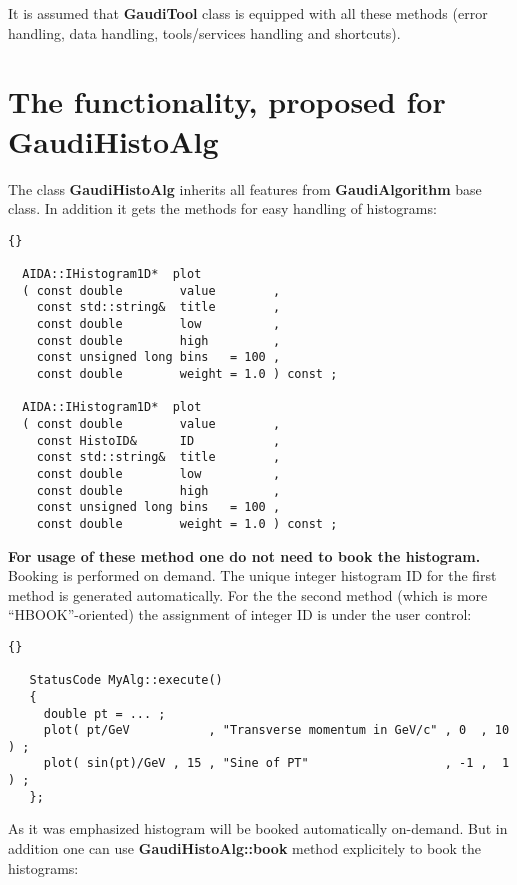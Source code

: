 \documentclass{lhcbnote}
\newcommand{\bftt}         {\ttfamily\bfseries}
\begin{document}
It is assumed that {\bftt{GaudiTool}} class is equipped with
all these methods (error handling, data handling,
tools/services handling and shortcuts).

\chapter{The functionality, proposed for {\bftt{GaudiHistoAlg}}}
The class {\bftt{GaudiHistoAlg}} inherits all features
from {\bftt{GaudiAlgorithm}} base class. In addition it gets
the methods for easy handling of histograms:

\begin{scriptsize}
 \begin{lstlisting}{}

  AIDA::IHistogram1D*  plot
  ( const double        value        ,
    const std::string&  title        ,
    const double        low          ,
    const double        high         ,
    const unsigned long bins   = 100 ,
    const double        weight = 1.0 ) const ;

  AIDA::IHistogram1D*  plot
  ( const double        value        ,
    const HistoID&      ID           ,
    const std::string&  title        ,
    const double        low          ,
    const double        high         ,
    const unsigned long bins   = 100 ,
    const double        weight = 1.0 ) const ;

 \end{lstlisting}
\end{scriptsize}

{\bf{For usage of these method one do not need to book the histogram.}}
Booking is performed on demand. The unique integer histogram ID
for the first method is generated automatically.
For the the second method (which is more ``HBOOK''-oriented)
the assignment of integer ID is under the user control:

\begin{scriptsize}
 \begin{lstlisting}{}

   StatusCode MyAlg::execute()
   {
     double pt = ... ;
     plot( pt/GeV           , "Transverse momentum in GeV/c" , 0  , 10 ) ;
     plot( sin(pt)/GeV , 15 , "Sine of PT"                   , -1 ,  1 ) ;
   };

 \end{lstlisting}
\end{scriptsize}

As it was emphasized histogram will be booked automatically on-demand.
But in addition one can use {\bftt{GaudiHistoAlg::book}} method explicitely to book
the histograms:
\end{document}
